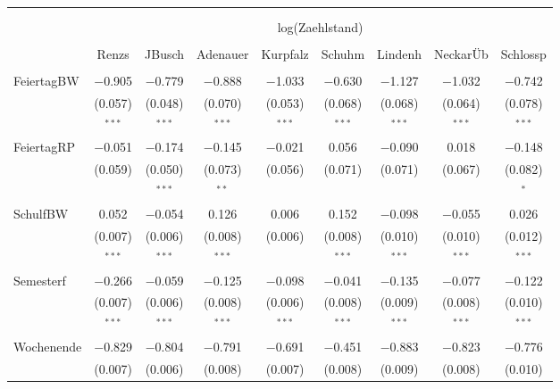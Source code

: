 \documentclass[a4paper,12pt]{thesis}
\begin{document}
\begin{table}[!htbp] \centering 
	\caption{} 
	\label{utilitarian} 
	\begin{tabular}{@{\extracolsep{-8pt}}lcccccccc} 
		\\[-1.8ex]\hline 
		\hline \\[-1.8ex] 
		\\[-1.8ex] & \multicolumn{8}{c}{log(Zaehlstand)} \\ 
		\\[-1.8ex] & Renzs & JBusch & Adenauer & Kurpfalz & Schuhm & Lindenh & NeckarÜb & Schlossp\\ 
		\hline \\[-1.8ex] 
		FeiertagBW & $-$0.905 & $-$0.779 & $-$0.888 & $-$1.033 & $-$0.630 & $-$1.127 & $-$1.032 & $-$0.742 \\ 
		& (0.057) & (0.048) & (0.070) & (0.053) & (0.068) & (0.068) & (0.064) & (0.078) \\ 
		& $^{***}$ & $^{***}$ & $^{***}$ & $^{***}$ & $^{***}$ & $^{***}$ & $^{***}$ & $^{***}$ \\ 
		FeiertagRP & $-$0.051 & $-$0.174 & $-$0.145 & $-$0.021 & 0.056 & $-$0.090 & 0.018 & $-$0.148 \\ 
		& (0.059) & (0.050) & (0.073) & (0.056) & (0.071) & (0.071) & (0.067) & (0.082) \\ 
		& & $^{***}$ & $^{**}$ & & & & & $^{*}$ \\ 
		SchulfBW & 0.052 & $-$0.054 & 0.126 & 0.006 & 0.152 & $-$0.098 & $-$0.055 & 0.026 \\ 
		& (0.007) & (0.006) & (0.008) & (0.006) & (0.008) & (0.010) & (0.010) & (0.012) \\ 
		& $^{***}$ & $^{***}$ & $^{***}$ & & $^{***}$ & $^{***}$ & $^{***}$ & $^{***}$ \\ 
		Semesterf & $-$0.266 & $-$0.059 & $-$0.125 & $-$0.098 & $-$0.041 & $-$0.135 & $-$0.077 & $-$0.122 \\ 
		& (0.007) & (0.006) & (0.008) & (0.006) & (0.008) & (0.009) & (0.008) & (0.010) \\ 
		& $^{***}$ & $^{***}$ & $^{***}$ & $^{***}$ & $^{***}$ & $^{***}$ & $^{***}$ & $^{***}$ \\ 
		Wochenende & $-$0.829 & $-$0.804 & $-$0.791 & $-$0.691 & $-$0.451 & $-$0.883 & $-$0.823 & $-$0.776 \\ 
		& (0.007) & (0.006) & (0.008) & (0.007) & (0.008) & (0.009) & (0.008) & (0.010) \\ 

\end{tabular}
\end{table}
\end{document}
